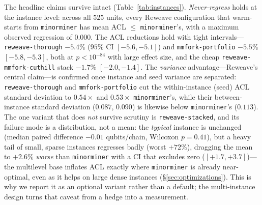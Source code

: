 \documentclass[acmsmall,anonymous,nonacm]{acmart}
\begin{document}
The headline claims survive intact (Table~\ref{tab:instances}). \emph{Never-regress}
holds at the instance level: across all $525$ units, every Reweave configuration that
warm-starts from \texttt{minorminer} has mean ACL $\le$ \texttt{minorminer}'s, with a
maximum observed regression of $0.000$. The ACL reductions hold with tight
intervals---\texttt{reweave-thorough} $-5.4\%$ ($95\%$ CI $[-5.6,-5.1]$) and
\texttt{mmfork-portfolio} $-5.5\%$ $[-5.8,-5.3]$, both at $p<10^{-84}$ with large
effect size, and the cheap \texttt{reweave-mmfork-cuthill} stack $-1.7\%$
$[-2.0,-1.4]$. The \emph{variance} advantage---Reweave's central claim---is confirmed
once instance and seed variance are separated: \texttt{reweave-thorough} and
\texttt{mmfork-portfolio} cut the within-instance (seed) ACL standard deviation to
$0.54\times$ and $0.53\times$ \texttt{minorminer}'s, while their between-instance
standard deviation ($0.087$, $0.090$) is likewise below \texttt{minorminer}'s
($0.113$). The one variant that does \emph{not} survive scrutiny is
\texttt{reweave-stacked}, and its failure mode is a distribution, not a mean: the
\emph{typical} instance is unchanged (median paired difference $-0.01$ qubits/chain,
Wilcoxon $p=0.41$), but a heavy tail of small, sparse instances regresses badly
(worst $+72\%$), dragging the mean to $+2.6\%$ \emph{worse} than \texttt{minorminer}
with a CI that excludes zero ($[+1.7,+3.7]$)---the multilevel base inflates ACL
exactly where \texttt{minorminer} is already near-optimal, even as it helps on
large dense instances (\S\ref{sec:optimizations}). This is why we report it as an
optional variant rather than a default; the
multi-instance design turns that caveat from a hedge into a measurement.

\begin{table}[t]
\caption{The headline claims under $K=15$ instances per cell (pooled over all cells and
targets; $525$ paired per-(cell, target, instance) units). $\Delta$ACL is the mean
per-instance change vs.\ \texttt{minorminer} with a bootstrap $95\%$ CI; ``seed std''
is the within-instance ACL standard deviation and its ratio to \texttt{minorminer}'s;
$p$ is Holm-corrected paired Wilcoxon. $^{***}$\,significantly \emph{better} than
\texttt{minorminer} ($p<10^{-3}$); $^{\dagger}$\,significantly worse.
\texttt{reweave-stacked}'s mean CI excludes zero while its median is null---a heavy
tail, not a shift; see text.}
\label{tab:instances}
\small
\centering

\end{table}
\end{document}
